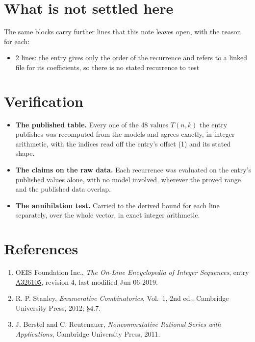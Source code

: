 \documentclass[11pt]{article}
\theoremstyle{definition}
\begin{document}
\section{What is not settled here}

The same blocks carry further lines that this note leaves open, with the reason for each:

\begin{itemize}

\item 2 lines: the entry gives only the order of the recurrence and refers to a linked file for its coefficients, so there is no stated recurrence to test

\end{itemize}

\section{Verification}

\begin{itemize}

\item {\bfseries The published table.} Every one of the 48 values $T(n,k)$ the entry publishes was recomputed from the models and agrees exactly, in integer arithmetic, with the indices read off the entry's offset (1) and its stated shape.

\item {\bfseries The claims on the raw data.} Each recurrence was evaluated on the entry's published values alone, with no model involved, wherever the proved range and the published data overlap.

\item {\bfseries The annihilation test.} Carried to the derived bound for each line separately, over the whole vector, in exact integer arithmetic.

\end{itemize}

\section{References}

\begin{enumerate}

\item OEIS Foundation Inc., \emph{The On-Line Encyclopedia of Integer Sequences}, entry \href{https://oeis.org/A326105}{A326105}, revision 4, last modified Jun 06 2019.

\item R. P. Stanley, \emph{Enumerative Combinatorics}, Vol.~1, 2nd ed., Cambridge University Press, 2012; \S4.7.

\item J. Berstel and C. Reutenauer, \emph{Noncommutative Rational Series with Applications}, Cambridge University Press, 2011.

\end{enumerate}
\end{document}
